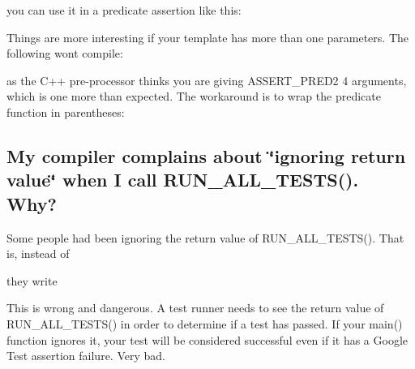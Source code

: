 \begin{DoxyCode}{0}
\DoxyCodeLine{\}}
\end{DoxyCode}


you can use it in a predicate assertion like this\+:


\begin{DoxyCode}{0}
\end{DoxyCode}


Things are more interesting if your template has more than one parameters. The following won\textquotesingle{}t compile\+:


\begin{DoxyCode}{0}
\end{DoxyCode}


as the C++ pre-\/processor thinks you are giving {\ttfamily A\+S\+S\+E\+R\+T\+\_\+\+P\+R\+E\+D2} 4 arguments, which is one more than expected. The workaround is to wrap the predicate function in parentheses\+:


\begin{DoxyCode}{0}
\end{DoxyCode}


\subsection*{My compiler complains about \char`\"{}ignoring return value\char`\"{} when I call R\+U\+N\+\_\+\+A\+L\+L\+\_\+\+T\+E\+S\+T\+S(). Why?}

Some people had been ignoring the return value of {\ttfamily R\+U\+N\+\_\+\+A\+L\+L\+\_\+\+T\+E\+S\+T\+S()}. That is, instead of


\begin{DoxyCode}{0}
\end{DoxyCode}


they write


\begin{DoxyCode}{0}
\end{DoxyCode}


This is wrong and dangerous. A test runner needs to see the return value of {\ttfamily R\+U\+N\+\_\+\+A\+L\+L\+\_\+\+T\+E\+S\+T\+S()} in order to determine if a test has passed. If your {\ttfamily main()} function ignores it, your test will be considered successful even if it has a Google Test assertion failure. Very bad.


